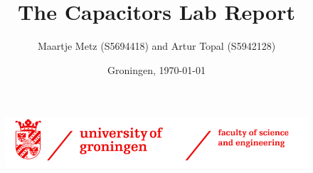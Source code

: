 \documentclass[a4paper, 10pt]{extarticle}
\title{\textbf{The Capacitors Lab Report}}
\author{Maartje Metz (S5694418) and Artur Topal (S5942128) }
\date{Groningen, \today}
\begin{document}
\begin{figure}
    \includegraphics[width=1\linewidth]{capacitors/img/RUG.png}
    \label{fig:enter-label}
    \end{figure}
\maketitle
    
\begin{abstract}
    \textit{}
\end{abstract}

\tableofcontents
\vspace{1cm}







\appendix




\printbibliography
\end{document}
